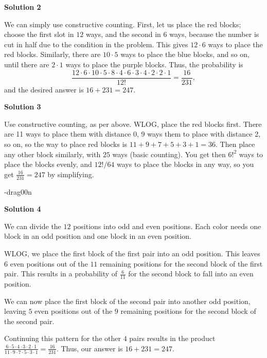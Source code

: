 \begin{enumerate}
 



\textbf{Solution 2}

We can simply use constructive counting. First, let us place the red blocks; choose the first slot in $12$ ways, and the second in $6$ ways, because the number is cut in half due to the condition in the problem. This gives $12 \cdot 6$ ways to place the red blocks. Similarly, there are $10 \cdot 5$ ways to place the blue blocks, and so on, until there are $2 \cdot 1$ ways to place the purple blocks. Thus, the probability is 
 \[\frac{12 \cdot 6 \cdot 10 \cdot 5 \cdot 8 \cdot 4 \cdot 6 \cdot 3 \cdot 4 \cdot 2 \cdot 2 \cdot 1}{12!}=\frac{16}{231},\] and the desired answer is $16+231=\boxed{247}$.

 



\textbf{Solution 3}

Use constructive counting, as per above. WLOG, place the red blocks first. There are 11 ways to place them with distance 0, 9 ways them to place with distance 2, so on, so the way to place red blocks is $11+9+7+5+3+1=36$. Then place any other block similarly, with $25$ ways (basic counting). You get then $6!^2$ ways to place the blocks evenly, and $12!/64$ ways to place the blocks in any way, so you get $\frac{16}{231}=247$ by simplifying.

 -drag00n

 



\textbf{Solution 4}

We can divide the $12$ positions into odd and even positions. Each color needs one block in an odd position and one block in an even position.

 WLOG, we place the first block of the first pair into an odd position. This leaves $6$ even positions out of the $11$ remaining positions for the second block of the first pair. This results in a probability of $\frac{6}{11}$ for the second block to fall into an even position.

 We can now place the first block of the second pair into another odd position, leaving $5$ even positions out of the $9$ remaining positions for the second block of the second pair.

 Continuing this pattern for the other $4$ pairs results in the product $\frac{6\cdot5\cdot4\cdot3\cdot2\cdot1}{11\cdot9\cdot7\cdot5\cdot3\cdot1}=\frac{16}{231}$. Thus, our answer is $16+231=\boxed{247}$.

 




\end{enumerate}
